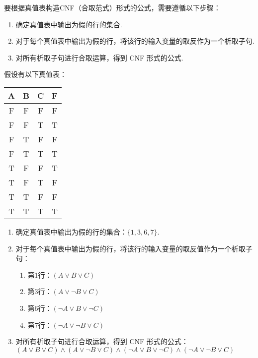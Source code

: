 \documentclass[cn, hazy, blue, normal, 12pt]{elegantnote}
\begin{document}
要根据真值表构造CNF（合取范式）形式的公式，需要遵循以下步骤：

\begin{enumerate}
    \item 确定真值表中输出为假的行的集合.
    \item 对于每个真值表中输出为假的行，将该行的输入变量的取反作为一个析取子句.
    \item 对所有析取子句进行合取运算，得到 CNF 形式的公式.
\end{enumerate}

假设有以下真值表：

\begin{center}
    \begin{tabular}{ccc|c}
        \hline
        A & B & C & F \\
        \hline
        F & F & F & F \\
        F & F & T & T \\
        F & T & F & F \\
        F & T & T & T \\
        T & F & F & T \\
        T & F & T & F \\
        T & T & F & F \\
        T & T & T & T \\
        \hline
    \end{tabular}
\end{center}

\begin{enumerate}
    \item 确定真值表中输出为假的行的集合：$\{ 1, 3, 6, 7 \}$.
    \item 对于每个真值表中输出为假的行，将该行的输入变量的取反值作为一个析取子句：
          \begin{enumerate}
              \item 第1行：$(A \lor B \lor C)$
              \item 第3行：$(A \lor \neg B \lor C)$
              \item 第6行：$(\neg A \lor B \lor \neg C)$
              \item 第7行：$(\neg A \lor \neg B \lor C)$
          \end{enumerate}
    \item 对所有析取子句进行合取运算，得到 CNF 形式的公式：\\
          $(A \lor B \lor C) \land (A \lor \neg B \lor C) \land (\neg A \lor B \lor \neg C) \land (\neg A \lor \neg B \lor C)$
\end{enumerate}
\end{document}
